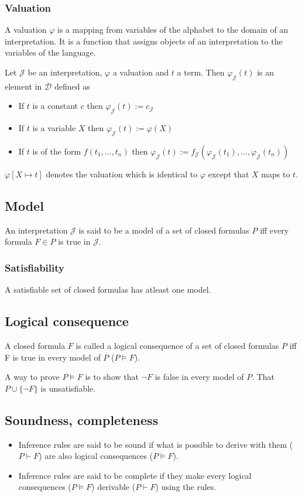 \documentclass{article}
\begin{document}
\subsubsection{Valuation}
A valuation $\varphi$ is a mapping from variables of the alphabet to the domain of an interpretation. It is a function that assigns objects of an interpretation to the variables of the language.

Let $\mathcal{J}$ be an interpretation, $\varphi$ a valuation and $t$ a term. Then $\varphi_\mathcal{J}(t)$ is an element in $\mathcal{D}$ defined as
\begin{itemize}
    \item If $t$ is a constant $c$ then $\varphi_\mathcal{J}(t) := c_\mathcal{J}$
    \item If $t$ is a variable $X$ then $\varphi_\mathcal{J}(t) := \varphi(X)$
    \item If $t$ is of the form $f(t_1,\ldots,t_n)$ then $\varphi_\mathcal{J}(t) := f_\mathcal{J}(\varphi_\mathcal{J}(t_1),\ldots,\varphi_\mathcal{J}(t_n))$
\end{itemize}
$\varphi[X\mapsto t]$ denotes the valuation which is identical to $\varphi$ except that $X$ maps to $t$.



\subsection{Model}
An interpretation $\mathcal{J}$ is said to be a model of a set of closed formulas $P$ iff every formula $F\in P$ is true in $\mathcal{J}$.

\subsubsection{Satisfiability}
A satisfiable set of closed formulas has atleast one model.

\subsection{Logical consequence}
A closed formula $F$ is called a logical consequence of a set of closed formulas $P$ iff F is true in every model of $P$ ($P\models F$).

A way to prove $P\models F$ is to show that $\lnot F$ is false in every model of $P$. That $P\cup\{\lnot F\}$ is unsatisfiable.
\subsection{Soundness, completeness}
\begin{itemize}
    \item Inference rules are said to be sound if what is possible to derive with them ($P\vdash F$) are also logical consequences ($P\models F$).
    \item Inference rules are said to be complete if they make every logical consequences ($P\models F$) derivable ($P\vdash F$) using the rules.
\end{itemize}
\end{document}
